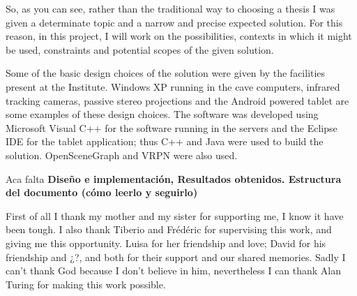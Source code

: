 So, as you can see, rather than the traditional way to choosing a thesis I was given a determinate topic and a narrow and precise expected solution. For this reason, in this project, I will work on the possibilities, contexts in which it might be used, constraints and potential scopes of the given solution.

Some of the basic design choices of the solution were given by the facilities present at the Institute. Windows XP running in the cave computers, infrared tracking cameras, passive stereo projections and the Android powered tablet are some examples of these design choices. The software was developed using Microsoft Visual C++ for the software running in the servers and the Eclipse IDE for the tablet application; thus C++ and Java were used to build the solution. OpenSceneGraph and VRPN were also used.



Aca falta \textbf{Diseño e implementación, Resultados obtenidos. Estructura del documento (cómo leerlo y seguirlo)}



First of all I thank my mother and my sister for supporting me, I know it have been tough. I also thank Tiberio and Frédéric for supervising this work, and giving me this opportunity. Luisa for her friendship and love; David for his friendship and ¿?, and both for their support and our shared memories. Sadly I can't thank God because I don't believe in him, nevertheless I can thank Alan Turing for making this work possible.